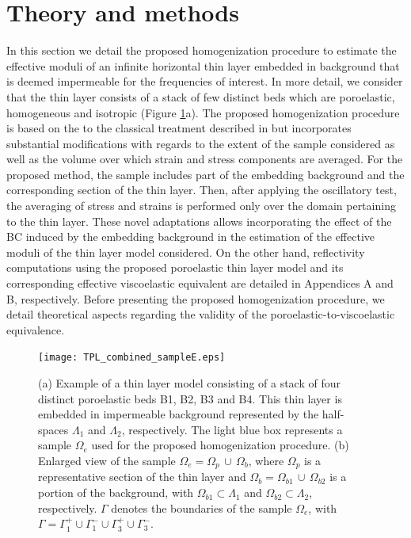 \documentclass[draft]{agujournal2019}
\begin{document}
\section{Theory and methods}
In this section we detail the proposed homogenization procedure to estimate the effective moduli of an infinite horizontal thin layer embedded in background that is deemed impermeable for the frequencies of interest.  
In more detail, we consider that the thin layer consists of a stack of few distinct beds which are poroelastic, homogeneous and isotropic (Figure \ref{fig.1}a). 
The proposed homogenization procedure is based on the to the classical treatment described in  but incorporates substantial modifications with regards to
the extent of the sample considered as well as the volume over which strain and stress components are averaged. For the proposed method, the sample includes part of the embedding background and the corresponding section of the thin layer. Then, after applying the oscillatory test, the averaging of stress and strains is performed only over the domain pertaining to the thin layer.
 These novel adaptations allows
incorporating the effect of the BC induced by the embedding background in the estimation of the effective moduli of the thin layer model considered. 
On the other hand, reflectivity computations using the proposed poroelastic thin layer model  and its corresponding effective viscoelastic equivalent are detailed in Appendices A and B, respectively. Before presenting the proposed homogenization procedure,
we detail theoretical aspects regarding the validity of the poroelastic-to-viscoelastic equivalence.

\begin{figure}[!ht]
\centering
        \texttt{[image: TPL\_combined\_sampleE.eps]}
\caption{ (a) Example of a thin layer model consisting of a stack of four distinct poroelastic beds B1, B2, B3 and B4. This thin layer is embedded in impermeable background represented by the half-spaces $\Lambda_1$ and $\Lambda_2$, respectively. The light blue box represents a sample $\Omega_e$ used for the proposed homogenization procedure. (b) Enlarged view of the sample $\Omega_e = \Omega_p \, \cup \, \Omega_b$, where  $\Omega_p$ is a representative section of the thin layer and  $\Omega_b= \Omega_{b1}  \, \cup \, \Omega_{b2}$ is a portion of the background, with $\Omega_{b1} \subset \Lambda_1$ and $\Omega_{b2} \subset \Lambda_2$, respectively. $\Gamma$ denotes the boundaries of the  sample $\Omega_e$, with  $\Gamma = \Gamma_1^+ \cup \Gamma_1^- \cup \Gamma_3^+ \cup \Gamma_3^-$.
}
\label{fig.1}
\end{figure}
\end{document}
